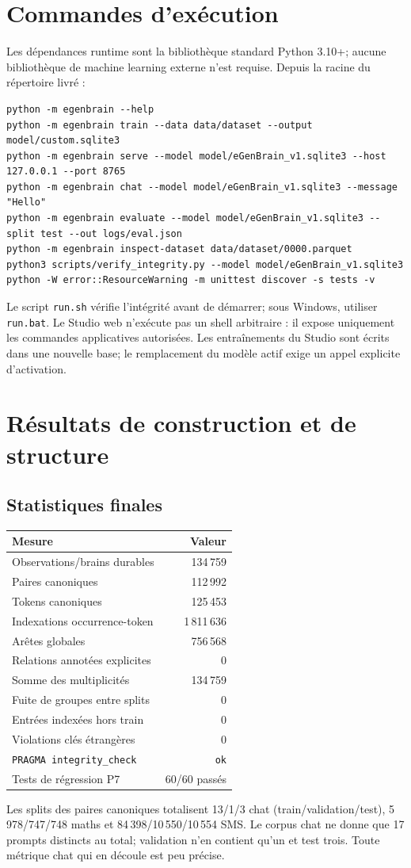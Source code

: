 \documentclass[11pt,a4paper,openany]{book}
\begin{document}
\chapter{Commandes d'exécution}
Les dépendances runtime sont la bibliothèque standard Python 3.10+; aucune bibliothèque de machine learning externe n'est requise. Depuis la racine du répertoire livré :
\begin{verbatim}
python -m egenbrain --help
python -m egenbrain train --data data/dataset --output model/custom.sqlite3
python -m egenbrain serve --model model/eGenBrain_v1.sqlite3 --host 127.0.0.1 --port 8765
python -m egenbrain chat --model model/eGenBrain_v1.sqlite3 --message "Hello"
python -m egenbrain evaluate --model model/eGenBrain_v1.sqlite3 --split test --out logs/eval.json
python -m egenbrain inspect-dataset data/dataset/0000.parquet
python3 scripts/verify_integrity.py --model model/eGenBrain_v1.sqlite3
python -W error::ResourceWarning -m unittest discover -s tests -v
\end{verbatim}
Le script \texttt{run.sh} vérifie l'intégrité avant de démarrer; sous Windows, utiliser \texttt{run.bat}. Le Studio web n'exécute pas un shell arbitraire : il expose uniquement les commandes applicatives autorisées. Les entraînements du Studio sont écrits dans une nouvelle base; le remplacement du modèle actif exige un appel explicite d'activation.

\chapter{Résultats de construction et de structure}
\section{Statistiques finales}
\begin{center}\begin{tabular}{lr}\toprule Mesure & Valeur\\\midrule
Observations/brains durables & 134\,759\\
Paires canoniques & 112\,992\\
Tokens canoniques & 125\,453\\
Indexations occurrence-token & 1\,811\,636\\
Arêtes globales & 756\,568\\
Relations annotées explicites & 0\\
Somme des multiplicités & 134\,759\\
Fuite de groupes entre splits & 0\\
Entrées indexées hors train & 0\\
Violations clés étrangères & 0\\
\texttt{PRAGMA integrity\_check} & \texttt{ok}\\
Tests de régression P7 & 60/60 passés\\\bottomrule\end{tabular}\end{center}
Les splits des paires canoniques totalisent 13/1/3 chat (train/validation/test), 5\,978/747/748 maths et 84\,398/10\,550/10\,554 SMS. Le corpus chat ne donne que 17 prompts distincts au total; validation n'en contient qu'un et test trois. Toute métrique chat qui en découle est peu précise.
\end{document}
